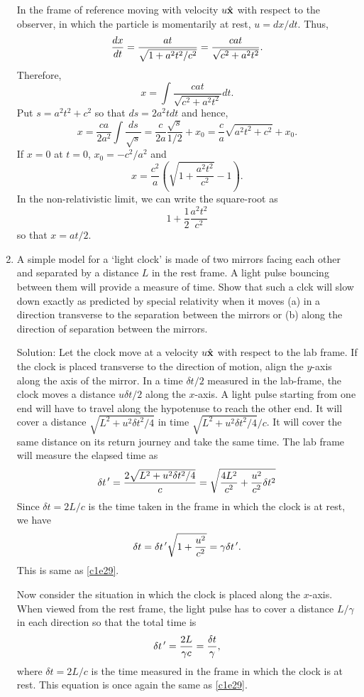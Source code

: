 \begin{enumerate}
In the frame of reference moving with velocity $u\hat{\mathbf{x}}$ with respect to the 
observer, in which the particle is momentarily at rest, $u = dx/dt$. Thus,
\[
\frac{d{x}}{d{t}} = \frac{at}{\sqrt{1 + a^2t^2/c^2}} = \frac{cat}{\sqrt{c^2 + a^2t^2}}.
\]
Therefore,
\[
x = \int \frac{cat}{\sqrt{c^2 + a^2t^2}}dt.
\]
Put $s = a^2t^2 + c^2$ so that $ds = 2a^2tdt$ and hence,
\[
x = \frac{ca}{2a^2} \int \frac{ds}{\sqrt{s}} = 
\frac{c}{2a}\frac{\sqrt{s}}{1/2} + x_0
= \frac{c}{a}\sqrt{a^2t^2 + c^2} + x_0.
\] 
If $x = 0$ at $t = 0$, $x_0 = -c^2/a^2$ and 
\begin{equation}\label{c1e102}
x = \frac{c^2}{a}\left(\sqrt{1 + \frac{a^2t^2}{c^2}} - 1\right).
\end{equation}
In the non-relativistic limit, we can write the square-root as 
\[
1 + \frac{1}{2}\frac{a^2t^2}{c^2}
\]
so that $x = at/2$.

\item A simple model for a `light clock' is made of two mirrors facing each 
other and separated by a distance $L$ in the rest frame. A light pulse bouncing
between them will provide a measure of time. Show that such a clck will slow
down exactly as predicted by special relativity when it moves (a) in a direction
transverse to the separation between the mirrors or (b) along the direction of
separation between the mirrors.\cite{pg}
\item[Solution:]
Let the clock move at a velocity $u\hat{\mathbf{x}}$ with respect to the lab frame. If
the clock is placed transverse to the direction of motion, align the $y$-axis
along the axis of the mirror. In a time $\delta t/2$ measured in the lab-frame,
the clock moves a distance $u\delta t/2$ along the $x$-axis. A light pulse 
starting from one end will have to travel along the hypotenuse to reach the 
other end. It will cover a distance $\sqrt{L^2 + u^2\delta t^2/4}$ in time
$\sqrt{L^2 + u^2\delta t^2/4}/c$. It will cover the same distance on its return
journey and take the same time. The lab frame will measure the elapsed time as
\[
\delta t^{\,\prime} = \frac{2\sqrt{L^2 + u^2\delta t^2/4}}{c} =
\sqrt{\frac{4L^2}{c^2} + \frac{u^2}{c^2}\delta t^2} 
\]
Since $\delta t = 2L/c$ is the time taken in the frame in which the clock is
at rest, we have
\[
\delta t = \delta t^{\,\prime}\sqrt{1 + \frac{u^2}{c^2}} = \gamma\delta t^{\,\prime}.
\]
This is same as \eqref{c1e29}.

Now consider the situation in which the clock is placed along the $x$-axis.
When viewed from the rest frame, the light pulse has to cover a distance
$L/\gamma$ in each direction so that the total time is
\[
\delta t^{\,\prime} = \frac{2L}{\gamma c} = \frac{\delta t}{\gamma},
\]
where $\delta t = 2L/c$ is the time measured in the frame in which the clock
is at rest. This equation is once again the same as \eqref{c1e29}.
\end{enumerate}
